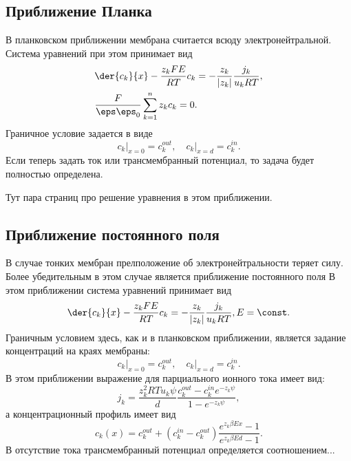 \documentclass{hedwork}
\begin{document}
    \subsection{Приближение Планка}
    В планковском приближении мембрана считается всюду электронейтральной.
    Система уравнений при этом принимает вид
    \begin{align*}
        & \der{c_k}{x} - \frac{z_kFE}{RT}c_k =
            -\frac{z_k}{|z_k|}\frac{j_k}{u_kRT}, \\
        & \frac{F}{\eps\eps_0}\sum_{k=1}^n z_k c_k = 0.
    \end{align*}
    Граничное условие задается в виде
    \[
        \left.c_k\right|_{x=0} = c_k^{out},\quad \left.c_k\right|_{x=d} = c_k^{in}.
    \]
    Если теперь задать ток или трансмембранный потенциал, то задача будет
    полностью определена.

    Тут пара страниц про решение уравнения в этом приближении.

    \subsection{Приближение постоянного поля}
    В случае тонких мембран прелположение об электронейтральности теряет силу.
    Более убедительным в этом случае является приближение постоянного поля
    В этом приближении система уравнений принимает вид
    \[
        \der{c_k}{x} - \frac{z_kFE}{RT}c_k = -\frac{z_k}{|z_k|}\frac{j_k}{u_kRT},
        E = \const.
    \]
    Граничным условием здесь, как и в планковском приближении, является задание
    концентраций на краях мембраны:
    \[
        \left.c_k\right|_{x=0} = c_k^{out},\quad \left.c_k\right|_{x=d} = c_k^{in}.
    \]
    В этом приближении выражение для парциального ионного тока имеет вид:
    \[
        j_k = \frac{z_k^2RTu_k\psi}{d}\frac{c_k^{out} - c_k^{in}e^{-z_k\psi}}{1 - e^{-z_k\psi}},
    \]
    а концентрационный профиль имеет вид
    \[
        c_k(x) = c_k^{out} + (c_k^{in}-c_k^{out})\frac{e^{z_k\beta Ex} - 1}{e^{z_k\beta Ed} - 1}.
    \]
    В отсутствие тока трансмембранный потенциал определяется соотношением...
\end{document}
